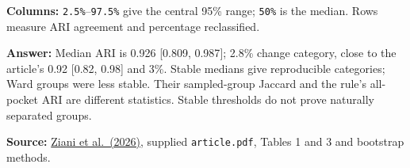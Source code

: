 \documentclass[
  10pt,
]{article}
\begin{document}
\textbf{Columns:} \texttt{2.5\%}--\texttt{97.5\%} give the central 95\%
range; \texttt{50\%} is the median. Rows measure ARI agreement and
percentage reclassified.

\textbf{Answer:} Median ARI is 0.926 {[}0.809, 0.987{]}; 2.8\% change
category, close to the article's 0.92 {[}0.82, 0.98{]} and 3\%. Stable
medians give reproducible categories; Ward groups were less stable.
Their sampled-group Jaccard and the rule's all-pocket ARI are different
statistics. Stable thresholds do not prove naturally separated groups.

\textbf{Source:} \href{https://doi.org/10.34133/csbj.0022}{Ziani et
al.~(2026)}, supplied \texttt{article.pdf}, Tables 1 and 3 and bootstrap
methods.
\end{document}
